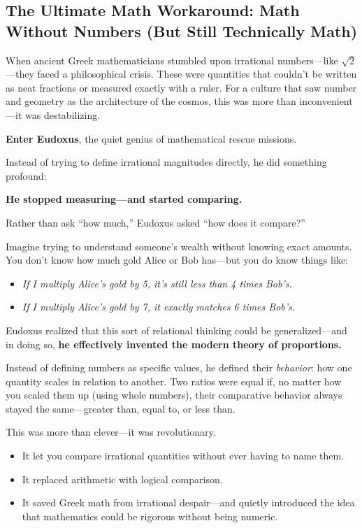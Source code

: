 \subsection{The Ultimate Math Workaround: Math Without Numbers (But Still Technically Math)}

When ancient Greek mathematicians stumbled upon irrational numbers—like \( \sqrt{2} \)—they faced a philosophical crisis. These were quantities that couldn’t be written as neat fractions or measured exactly with a ruler. For a culture that saw number and geometry as the architecture of the cosmos, this was more than inconvenient—it was destabilizing.

\textbf{Enter Eudoxus}, the quiet genius of mathematical rescue missions.

Instead of trying to define irrational magnitudes directly, he did something profound:

\textbf{He stopped measuring—and started comparing.}

\medskip

Rather than ask “how much,” Eudoxus asked “how does it compare?”

Imagine trying to understand someone’s wealth without knowing exact amounts. You don’t know how much gold Alice or Bob has—but you do know things like:

\begin{itemize}
    \item \textit{If I multiply Alice’s gold by 5, it’s still less than 4 times Bob’s.}
    \item \textit{If I multiply Alice’s gold by 7, it exactly matches 6 times Bob’s.}
\end{itemize}

Eudoxus realized that this sort of relational thinking could be generalized—and in doing so,  
\textbf{he effectively invented the modern theory of proportions.}

Instead of defining numbers as specific values, he defined their \textit{behavior}: how one quantity scales in relation to another. Two ratios were equal if, no matter how you scaled them up (using whole numbers), their comparative behavior always stayed the same—greater than, equal to, or less than.

\medskip

This was more than clever—it was revolutionary.

\begin{itemize}
    \item It let you compare irrational quantities without ever having to name them.
    \item It replaced arithmetic with logical comparison.
    \item It saved Greek math from irrational despair—and quietly introduced the idea that mathematics could be rigorous without being numeric.
\end{itemize}

